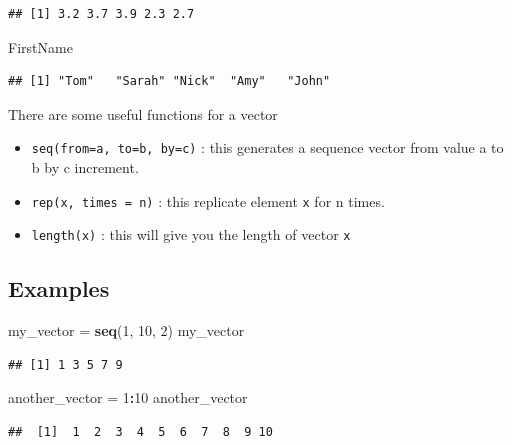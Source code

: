 \documentclass[
]{article}
\newenvironment{Shaded}{\begin{snugshade}}{\end{snugshade}}
\newcommand{\DecValTok}[1]{\textcolor[rgb]{0.00,0.00,0.81}{#1}}
\newcommand{\FunctionTok}[1]{\textcolor[rgb]{0.13,0.29,0.53}{\textbf{#1}}}
\newcommand{\NormalTok}[1]{#1}
\newcommand{\OtherTok}[1]{\textcolor[rgb]{0.56,0.35,0.01}{#1}}
\newcommand{\SpecialCharTok}[1]{\textcolor[rgb]{0.81,0.36,0.00}{\textbf{#1}}}
\begin{document}
\begin{verbatim}
## [1] 3.2 3.7 3.9 2.3 2.7
\end{verbatim}

\begin{Shaded}
\begin{Highlighting}[]
\NormalTok{FirstName}
\end{Highlighting}
\end{Shaded}

\begin{verbatim}
## [1] "Tom"   "Sarah" "Nick"  "Amy"   "John"
\end{verbatim}

There are some useful functions for a vector

\begin{itemize}
\item
  \texttt{seq(from=a,\ to=b,\ by=c)} : this generates a sequence vector
  from value a to b by c increment.
\item
  \texttt{rep(x,\ times\ =\ n)} : this replicate element \texttt{x} for
  n times.
\item
  \texttt{length(x)} : this will give you the length of vector
  \texttt{x}
\end{itemize}

\subsection{Examples}\label{examples}

\begin{Shaded}
\begin{Highlighting}[]
\NormalTok{my\_vector }\OtherTok{=} \FunctionTok{seq}\NormalTok{(}\DecValTok{1}\NormalTok{, }\DecValTok{10}\NormalTok{, }\DecValTok{2}\NormalTok{)}
\NormalTok{my\_vector}
\end{Highlighting}
\end{Shaded}

\begin{verbatim}
## [1] 1 3 5 7 9
\end{verbatim}

\begin{Shaded}
\begin{Highlighting}[]
\NormalTok{another\_vector }\OtherTok{=} \DecValTok{1}\SpecialCharTok{:}\DecValTok{10}
\NormalTok{another\_vector}
\end{Highlighting}
\end{Shaded}

\begin{verbatim}
##  [1]  1  2  3  4  5  6  7  8  9 10
\end{verbatim}
\end{document}
